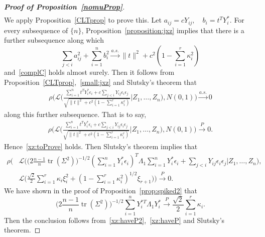 \documentclass[3p]{elsarticle}
\DeclareMathOperator{\mytr}{tr}
\theoremstyle{plain}
\theoremstyle{definition}
\theoremstyle{remark}
\begin{document}
\begin{proof}[\textbf{Proof of Proposition~\ref{nomuProp}}]
\begin{equation*}
\begin{aligned}
        \end{aligned}
    \end{equation*}
We apply Proposition~\ref{CLTprop} to prove this.
Let
$
    a_{ij}=cY_{ij},
    \quad
    b_i=t^T Y_i^*
$.
    For every subsequence of $\{n\}$, Proposition~\ref{proposition:jxz} implies that there is a further subsequence along which
    \begin{equation}\label{small:jxz}
    \sum_{j<i} a_{ij}^2+\sum_{i=1}^n b_i^2\xrightarrow{a.s.} \|t\|^2+c^2(1-\sum_{i=1}^r \kappa_i^2)
    \end{equation}
    and~\eqref{complC} holds almost surely.
    Then it follows from Proposition~\ref{CLTprop},~\eqref{small:jxz} and Slutsky's theorem that
    \begin{equation*}
        \begin{aligned}
            \rho\Bigg(\mathcal{L}\bigg( \frac{\sum_{i=1}^n t^T Y_i^* \epsilon_i+c\sum_{j<i} Y_{ij} \epsilon_i \epsilon_j}{\sqrt{\|t\|^2+c^2(1-\sum_{i=1}^r \kappa_i^r)}} \Big| Z_1,\ldots,Z_n\bigg)
            ,
            N (0,1)\Bigg)\xrightarrow{a.s.} 0
        \end{aligned}
    \end{equation*}
    along this further subsequence.
    That is to say,
    \begin{equation*}
        \begin{aligned}
            \rho\Bigg(\mathcal{L}\bigg( \frac{\sum_{i=1}^n t^T Y_i^* \epsilon_i+c\sum_{j<i} Y_{ij} \epsilon_i \epsilon_j}{\sqrt{\|t\|^2+c^2(1-\sum_{i=1}^r \kappa_i^r)}} \Big| Z_1,\ldots,Z_n\bigg)
            ,
            N (0,1)\Bigg)\xrightarrow{P} 0.
        \end{aligned}
    \end{equation*}
    Hence~\eqref{xz:toProve} holds.
    Then Slutsky's theorem implies that
    \begin{equation}\label{xz:haveP}
    \begin{aligned}
        \rho\Big(&
        \mathcal{L}\big(
        \big(2\frac{n-1}{n}\mytr(\Sigma^2)\big)^{-1/2}(\sum_{i=1}^n  Y_i^* \epsilon_i)^T \Lambda_1 \sum_{i=1}^n  Y_i^* \epsilon_i
        +
        \sum_{j<i} Y_{ij} \epsilon_i \epsilon_j
        |Z_1,\ldots,Z_n\big)
        ,\\
        &\mathcal{L}\big(\frac{\sqrt{2}}{2}\sum_{i=1}^r \kappa_i \xi_i^2 + (1-\sum_{i=1}^r \kappa_i^2)^{1/2}\xi_{r+1}\big)\Big)
        \xrightarrow{P}0.
    \end{aligned}
    \end{equation}
    We have shown in the proof of Proposition~\ref{prop:spiked2} that
        \begin{equation}\label{xz:haveP2}
        \big(2\frac{n-1}{n}\mytr(\Sigma^2)\big)^{-1/2}
        \sum_{i=1}^n Y_i^{*T}\Lambda_1 Y_i^*
      \xrightarrow{P}\frac{\sqrt{2}}{2}\sum_{i=1}^r \kappa_i.
        \end{equation}
        Then the conclusion follows from~\eqref{xz:haveP2},~\eqref{xz:haveP} and Slutsky's theorem.
        

\end{proof}
\end{document}

